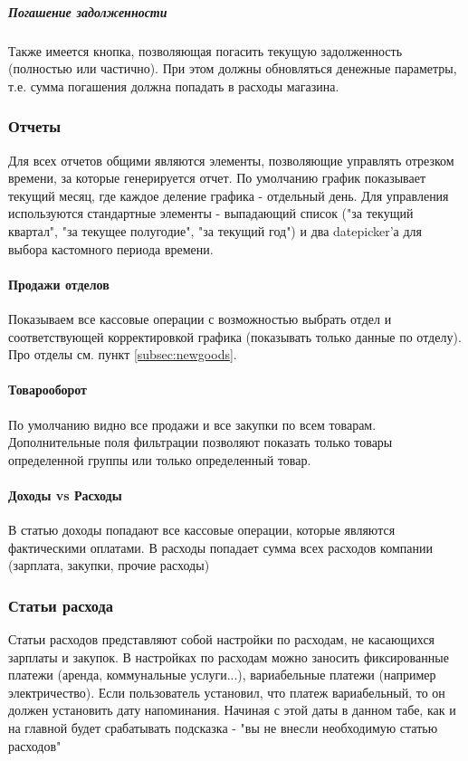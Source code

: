 \documentclass[DIV=calc, paper=a4, fontsize=11pt]{scrartcl} %
\begin{document}
\subparagraph{Погашение задолженности}
Также имеется кнопка, позволяющая погасить текущую задолженность (полностью или частично). При этом должны обновляться денежные параметры, т.е. сумма погашения должна попадать в расходы магазина.


\subsubsection{Отчеты}
Для всех отчетов общими являются элементы, позволяющие управлять отрезком времени, за которые генерируется отчет. По умолчанию график показывает текущий месяц, где каждое деление графика - отдельный день. Для управления используются стандартные элементы - выпадающий список ("за текущий квартал", "за текущее полугодие", "за текущий год") и два datepicker'а для выбора кастомного периода времени.

\paragraph{Продажи отделов}
Показываем все кассовые операции с возможностью выбрать отдел и соответствующей корректировкой графика (показывать только данные по отделу). Про отделы см. пункт \ref{subsec:newgoods}.

\paragraph{Товарооборот}
По умолчанию видно все продажи и все закупки по всем товарам. Дополнительные поля фильтрации позволяют показать только товары определенной группы или только определенный товар.

\paragraph{Доходы vs Расходы}
В статью доходы попадают все кассовые операции, которые являются фактическими оплатами. В расходы попадает сумма всех расходов компании (зарплата, закупки, прочие расходы)

\subsubsection{Статьи расхода}
Статьи расходов представляют собой настройки по расходам, не касающихся зарплаты и закупок. В настройках по расходам можно заносить фиксированные платежи (аренда, коммунальные услуги...), вариабельные платежи (например электричество). Если пользователь установил, что платеж вариабельный, то он должен установить дату напоминания. Начиная с этой даты в данном табе, как и на главной будет срабатывать подсказка - "вы не внесли необходимую статью расходов"
\end{document}
